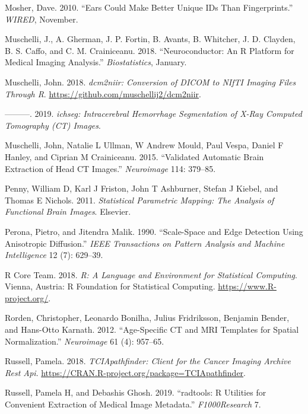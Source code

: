 \documentclass[]{elsarticle} %
\begin{document}
\leavevmode\hypertarget{ref-mosher_2010}{}%
Mosher, Dave. 2010. ``Ears Could Make Better Unique IDs Than Fingerprints.'' \emph{WIRED}, November.

\leavevmode\hypertarget{ref-neuroconductor}{}%
Muschelli, J., A. Gherman, J. P. Fortin, B. Avants, B. Whitcher, J. D. Clayden, B. S. Caffo, and C. M. Crainiceanu. 2018. ``Neuroconductor: An R Platform for Medical Imaging Analysis.'' \emph{Biostatistics}, January.

\leavevmode\hypertarget{ref-dcm2niir}{}%
Muschelli, John. 2018. \emph{dcm2niir: Conversion of DICOM to NIfTI Imaging Files Through R}. \url{https://github.com/muschellij2/dcm2niir}.

\leavevmode\hypertarget{ref-ichseg}{}%
---------. 2019. \emph{ichseg: Intracerebral Hemorrhage Segmentation of X-Ray Computed Tomography (CT) Images}.

\leavevmode\hypertarget{ref-ctbet}{}%
Muschelli, John, Natalie L Ullman, W Andrew Mould, Paul Vespa, Daniel F Hanley, and Ciprian M Crainiceanu. 2015. ``Validated Automatic Brain Extraction of Head CT Images.'' \emph{Neuroimage} 114: 379--85.

\leavevmode\hypertarget{ref-spm}{}%
Penny, William D, Karl J Friston, John T Ashburner, Stefan J Kiebel, and Thomas E Nichols. 2011. \emph{Statistical Parametric Mapping: The Analysis of Functional Brain Images}. Elsevier.

\leavevmode\hypertarget{ref-peronamalik}{}%
Perona, Pietro, and Jitendra Malik. 1990. ``Scale-Space and Edge Detection Using Anisotropic Diffusion.'' \emph{IEEE Transactions on Pattern Analysis and Machine Intelligence} 12 (7): 629--39.

\leavevmode\hypertarget{ref-R}{}%
R Core Team. 2018. \emph{R: A Language and Environment for Statistical Computing}. Vienna, Austria: R Foundation for Statistical Computing. \url{https://www.R-project.org/}.

\leavevmode\hypertarget{ref-rorden2012age}{}%
Rorden, Christopher, Leonardo Bonilha, Julius Fridriksson, Benjamin Bender, and Hans-Otto Karnath. 2012. ``Age-Specific CT and MRI Templates for Spatial Normalization.'' \emph{Neuroimage} 61 (4): 957--65.

\leavevmode\hypertarget{ref-TCIApathfinder}{}%
Russell, Pamela. 2018. \emph{TCIApathfinder: Client for the Cancer Imaging Archive Rest Api}. \url{https://CRAN.R-project.org/package=TCIApathfinder}.

\leavevmode\hypertarget{ref-radtools}{}%
Russell, Pamela H, and Debashis Ghosh. 2019. ``radtools: R Utilities for Convenient Extraction of Medical Image Metadata.'' \emph{F1000Research} 7.
\end{document}
